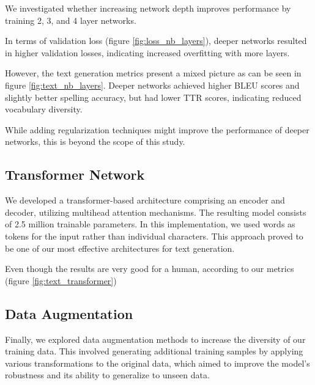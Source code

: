 \documentclass{article}
\begin{document}
We investigated whether increasing network depth improves performance by training 2, 3, and 4 layer networks.

In terms of validation loss (figure \ref{fig:loss_nb_layers}), deeper networks resulted in higher validation losses, indicating increased overfitting with more layers.

However, the text generation metrics present a mixed picture as can be seen in figure \ref{fig:text_nb_layers}. Deeper networks achieved higher BLEU scores and slightly better spelling accuracy, but had lower TTR scores, indicating reduced vocabulary diversity.

While adding regularization techniques might improve the performance of deeper networks, this is beyond the scope of this study.



\subsection{Transformer Network}

We developed a transformer-based architecture \cite{vaswani2023attention} comprising an encoder and decoder, utilizing multihead attention mechanisms. The resulting model consists of 2.5 million trainable parameters. In this implementation, we used words as tokens for the input rather than individual characters. This approach proved to be one of our most effective architectures for text generation.

Even though the results are very good for a human, according to our metrics (figure \ref{fig:text_transformer})

\subsection{Data Augmentation}

Finally, we explored data augmentation methods to increase the diversity of our training data. This involved generating additional training samples by applying various transformations to the original data, which aimed to improve the model's robustness and its ability to generalize to unseen data.
\end{document}
